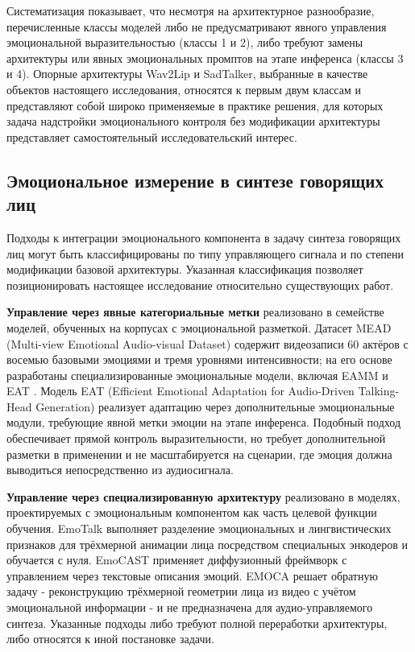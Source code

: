 \documentclass[a4paper, 12pt, oneside, openany]{article}
\begin{document}
Систематизация показывает, что несмотря на архитектурное разнообразие, перечисленные классы моделей либо не предусматривают явного управления эмоциональной выразительностью (классы 1 и 2), либо требуют замены архитектуры или явных эмоциональных промптов на этапе инференса (классы 3 и 4). Опорные архитектуры Wav2Lip и SadTalker, выбранные в качестве объектов настоящего исследования, относятся к первым двум классам и представляют собой широко применяемые в практике решения, для которых задача надстройки эмоционального контроля без модификации архитектуры представляет самостоятельный исследовательский интерес.

\subsection{Эмоциональное измерение в синтезе говорящих лиц}

Подходы к интеграции эмоционального компонента в задачу синтеза говорящих лиц могут быть классифицированы по типу управляющего сигнала и по степени модификации базовой архитектуры. Указанная классификация позволяет позиционировать настоящее исследование относительно существующих работ.

\textbf{Управление через явные категориальные метки} реализовано в семействе моделей, обученных на корпусах с эмоциональной разметкой. Датасет MEAD \cite{wang2020mead} (Multi-view Emotional Audio-visual Dataset) содержит видеозаписи 60 актёров с восемью базовыми эмоциями и тремя уровнями интенсивности; на его основе разработаны специализированные эмоциональные модели, включая EAMM \cite{ji2022eamm} и EAT \cite{wang2023eat}. Модель EAT (Efficient Emotional Adaptation for Audio-Driven Talking-Head Generation) реализует адаптацию через дополнительные эмоциональные модули, требующие явной метки эмоции на этапе инференса. Подобный подход обеспечивает прямой контроль выразительности, но требует дополнительной разметки в применении и не масштабируется на сценарии, где эмоция должна выводиться непосредственно из аудиосигнала.

\textbf{Управление через специализированную архитектуру} реализовано в моделях, проектируемых с эмоциональным компонентом как часть целевой функции обучения. EmoTalk \cite{peng2023emotalk} выполняет разделение эмоциональных и лингвистических признаков для трёхмерной анимации лица посредством специальных энкодеров и обучается с нуля. EmoCAST \cite{jiang2025emocast} применяет диффузионный фреймворк с управлением через текстовые описания эмоций. EMOCA \cite{danecek2022emoca} решает обратную задачу - реконструкцию трёхмерной геометрии лица из видео с учётом эмоциональной информации - и не предназначена для аудио-управляемого синтеза. Указанные подходы либо требуют полной переработки архитектуры, либо относятся к иной постановке задачи.
\end{document}
